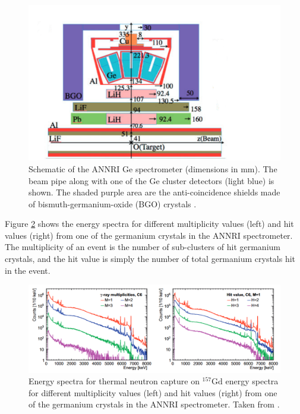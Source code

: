 \begin{figure}[htp]
    \centering
    \includegraphics[width=\textwidth]{Figures/annrigd.png}
    \caption[Schematic of the ANNRI Ge spectrometer (dimensions in mm).]{Schematic of the ANNRI Ge spectrometer (dimensions in mm). The beam pipe along with one of the Ge cluster detectors (light blue) is shown. The shaded purple area are the anti-coincidence shields made of bismuth-germanium-oxide (BGO) crystals \cite{annri_gd_energy}.}
    \label{fig:annrigd}
\end{figure}

Figure \ref{fig:annrigdenergyspectra} shows the energy spectra for different multiplicity values (left) and hit values (right) from one of the germanium crystals in the ANNRI spectrometer. The multiplicity of an event is the number of sub-clusters of hit germanium crystals, and the hit value is simply the number of total germanium crystals hit in the event. 

\begin{figure}[htp]
\centering 
\includegraphics[width=\textwidth]{Figures/annrigdenergyspectra.png}
\caption[Energy spectra for thermal neutron capture on ${ }^{157} \mathrm{Gd}$ energy spectra for different multiplicity values (left) and hit values (right) from one of the germanium crystals in the ANNRI spectrometer.]{Energy spectra for thermal neutron capture on ${ }^{157} \mathrm{Gd}$ energy spectra for different multiplicity values (left) and hit values (right) from one of the germanium crystals in the ANNRI spectrometer. Taken from \cite{annri_gd_energy}.}
\label{fig:annrigdenergyspectra}
\end{figure}

